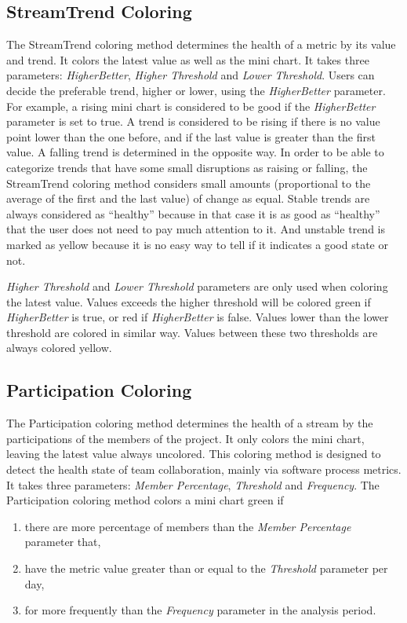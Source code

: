 \subsection{StreamTrend Coloring} 
\label{streamtrend}
The StreamTrend coloring method determines the health of a metric by its value and trend. It colors the latest value as well as the mini chart. It takes three parameters: {\it HigherBetter}, {\it Higher Threshold} and {\it Lower Threshold}. Users can decide the preferable trend, higher or lower, using the {\it HigherBetter} parameter. For example, a rising mini chart is considered to be good if the {\it HigherBetter} parameter is set to true. A trend is considered to be rising if there is no value point lower than the one before, and if the last value is greater than the first value. A falling trend is determined in the opposite way. In order to be able to categorize trends that have some small disruptions as raising or falling, the StreamTrend coloring method considers small amounts (proportional to the average of the first and the last value) of change as equal. Stable trends are always considered as ``healthy'' because in that case it is as good as ``healthy'' that the user does not need to pay much attention to it. And unstable trend is marked as yellow because it is no easy way to tell if it indicates a good state or not. 

{\it Higher Threshold} and {\it Lower Threshold} parameters are only used when coloring the latest value. Values exceeds the higher threshold will be colored green if {\it HigherBetter} is true, or red if {\it HigherBetter} is false. Values lower than the lower threshold are colored in similar way. Values between these two thresholds are always colored yellow.

\subsection{Participation Coloring}
\label{participation}
The Participation coloring method determines the health of a stream by the participations of the members of the project. It only colors the mini chart, leaving the latest value always uncolored. This coloring method is designed to detect the health state of team collaboration, mainly via software process metrics. It takes three parameters: {\it Member Percentage}, {\it Threshold} and {\it Frequency}. The Participation coloring method colors a mini chart green if 
\begin{enumerate}
\item there are more percentage of members than the {\it Member Percentage} parameter that,
\item have the metric value greater than or equal to the {\it Threshold} parameter per day,
\item for more frequently than the {\it Frequency} parameter in the analysis period.
\end{enumerate}

